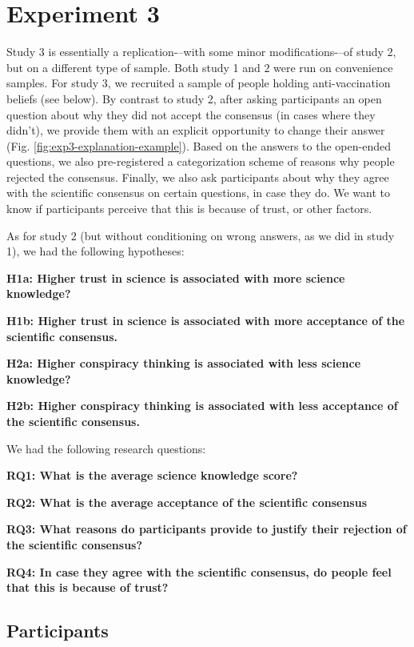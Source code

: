 \documentclass[
  doc,floatsintext]{apa6}
\begin{document}
\clearpage

\section{Experiment 3}\label{exp3}

Study 3 is essentially a replication-\/--with some minor modifications-\/--of study 2, but on a different type of sample. Both study 1 and 2 were run on convenience samples. For study 3, we recruited a sample of people holding anti-vaccination beliefs (see below). By contrast to study 2, after asking participants an open question about why they did not accept the consensus (in cases where they didn't), we provide them with an explicit opportunity to change their answer (Fig. \ref{fig:exp3-explanation-example}). Based on the answers to the open-ended questions, we also pre-registered a categorization scheme of reasons why people rejected the consensus. Finally, we also ask participants about why they agree with the scientific consensus on certain questions, in case they do. We want to know if participants perceive that this is because of trust, or other factors.

As for study 2 (but without conditioning on wrong answers, as we did in study 1), we had the following hypotheses:

\textbf{H1a: Higher trust in science is associated with more science knowledge?}

\textbf{H1b: Higher trust in science is associated with more acceptance of the scientific consensus.}

\textbf{H2a: Higher conspiracy thinking is associated with less science knowledge?}

\textbf{H2b: Higher conspiracy thinking is associated with less acceptance of the scientific consensus.}

We had the following research questions:

\textbf{RQ1: What is the average science knowledge score?}

\textbf{RQ2: What is the average acceptance of the scientific consensus}

\textbf{RQ3: What reasons do participants provide to justify their rejection of the scientific consensus?}

\textbf{RQ4: In case they agree with the scientific consensus, do people feel that this is because of trust?}

\subsection{Participants}\label{participants-3}
\end{document}
